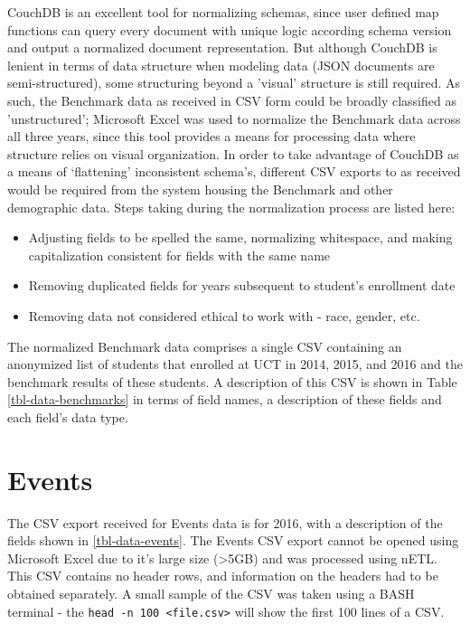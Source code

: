 CouchDB is an excellent tool for normalizing schemas, since user defined map functions can query every document with unique logic according schema version and output a normalized document representation. But although CouchDB is lenient in terms of data structure when modeling data (JSON documents are semi-structured), some structuring beyond a 'visual' structure is still required. As such, the Benchmark data as received in CSV form could be broadly classified as 'unstructured'; Microsoft Excel was used to normalize the Benchmark data across all three years, since this tool provides a means for processing data where structure relies on visual organization. In order to take advantage of CouchDB as a means of `flattening' inconsistent schema's, different CSV exports to as received would be required from the system housing the Benchmark and other demographic data. Steps taking during the normalization process are listed here:

\begin{itemize}
    \item Adjusting fields to be spelled the same, normalizing whitespace, and making capitalization consistent for fields with the same name
    \item Removing duplicated fields for years subsequent to student's enrollment date
    \item Removing data not considered ethical to work with - race, gender, etc.
\end{itemize}

The normalized Benchmark data comprises a single CSV containing an anonymized list of students that enrolled at UCT in 2014, 2015, and 2016 and the benchmark results of these students. A description of this CSV is shown in Table \ref{tbl-data-benchmarks} in terms of field names, a description of these fields and each field's data type.

\section{Events}
The CSV export received for Events data is for 2016, with a description of the fields shown in \ref{tbl-data-events}. The Events CSV export cannot be opened using Microsoft Excel due to it's large size (\textgreater 5GB) and was processed using nETL. This CSV contains no header rows, and information on the headers had to be obtained separately. A small sample of the CSV was taken using a BASH terminal - the \texttt{head -n 100 <file.csv>} will show the first 100 lines of a CSV.

\newpage


\newpage


\newpage

\vspace{80px}
